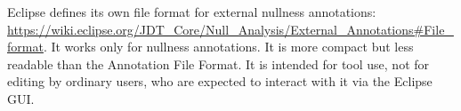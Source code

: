 \documentclass{article}
\begin{document}
Eclipse defines its own file format for external nullness annotations:
\url{https://wiki.eclipse.org/JDT_Core/Null_Analysis/External_Annotations#File_format}.
It works only for nullness annotations.  It is more compact but less
readable than the Annotation File Format.  It is intended for tool use, not
for editing by ordinary users, who are expected to interact with it
via the Eclipse GUI\@.




\end{document}
